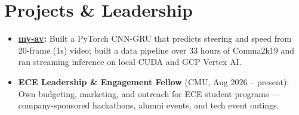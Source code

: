 \documentclass[11pt, letterpaper]{article}
\begin{document}
\section{Projects \& Leadership}
\begin{itemize}
  \item \textbf{\href{https://github.com/lordphone/my-av}{my-av}:} Built a PyTorch CNN-GRU that predicts steering and speed from 20-frame (1s) video; built a data pipeline over 33 hours of Comma2k19 and ran streaming inference on local CUDA and GCP Vertex AI.
  \item \textbf{ECE Leadership \& Engagement Fellow} (CMU, Aug 2026 -- present): Own budgeting, marketing, and outreach for ECE student programs --- company-sponsored hackathons, alumni events, and tech event outings.
\end{itemize}
\end{document}
